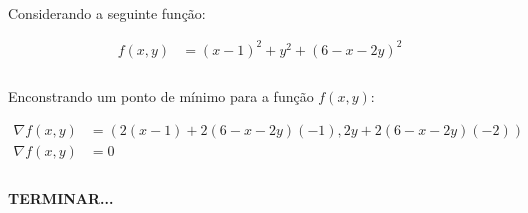 \documentclass{article}
\begin{document}
            \paragraph{}
            Considerando a seguinte função:

            \begin{align*}
                f(x, y) &= (x - 1)^2 + y^2 + (6 -x -2y)^2\\
            \end{align*}

            \paragraph{}
            Enconstrando um ponto de mínimo para a função $f(x, y)$:

            \begin{align*}
                \nabla f(x, y) &= \left(2(x - 1) + 2(6 - x - 2y)(-1), 2y + 2(6 - x - 2y)(-2)\right)\\
                \nabla f(x, y) &= 0\\
            \end{align*}

            \paragraph{}
            \textbf{TERMINAR...}
\end{document}
